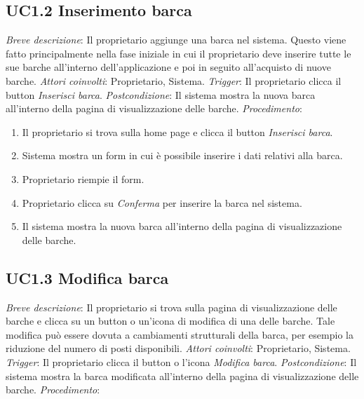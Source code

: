 \subsection{UC1.2 Inserimento barca}

\noindent \emph{Breve descrizione}: Il proprietario aggiunge una barca nel sistema. Questo viene fatto principalmente nella fase iniziale in cui il proprietario deve inserire
tutte le sue barche all'interno dell'applicazione e poi in seguito all'acquisto di nuove barche.\medbreak
\noindent \emph{Attori coinvolti}: Proprietario, Sistema.\medbreak
\noindent \emph{Trigger}: Il proprietario clicca il button \textit{Inserisci barca}.\medbreak
\noindent \emph{Postcondizione}: Il sistema mostra la nuova barca all'interno della pagina di visualizzazione delle barche.\medbreak
\noindent \emph{Procedimento}:

\begin{enumerate}
    \item Il proprietario si trova sulla home page e clicca il button \textit{Inserisci barca}.
    \item Sistema mostra un form in cui è possibile inserire i dati relativi alla barca.
    \item Proprietario riempie il form.
    \item Proprietario clicca su \textit{Conferma} per inserire la barca nel sistema.
    \item Il sistema mostra la nuova barca all'interno della pagina di visualizzazione delle barche.
\end{enumerate}

\subsection{UC1.3 Modifica barca}

\noindent \emph{Breve descrizione}: Il proprietario si trova sulla pagina di visualizzazione delle barche e clicca su un button o un'icona di modifica di una delle barche.
Tale modifica può essere dovuta a cambiamenti strutturali della barca, per esempio la riduzione del numero di posti disponibili.
\medbreak
\noindent \emph{Attori coinvolti}: Proprietario, Sistema.\medbreak
\noindent \emph{Trigger}: Il proprietario clicca il button o l'icona \textit{Modifica barca}.\medbreak
\noindent \emph{Postcondizione}: Il sistema mostra la barca modificata all'interno della pagina di visualizzazione delle barche.\medbreak
\noindent \emph{Procedimento}:

